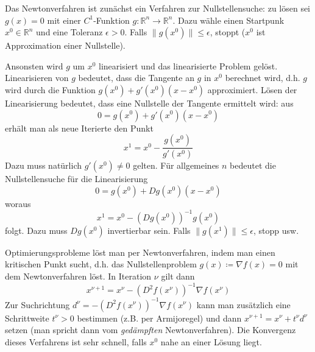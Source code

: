 \documentclass[12pt]{extreport} %
\newcommand{\R}{\mathbb{R}}
\theoremstyle{named}
\theoremstyle{nnamed}
\theoremstyle{itshape}
\theoremstyle{normal}
\begin{document}
Das Newtonverfahren ist zunächst ein Verfahren zur Nullstellensuche: zu lösen sei $g(x) = 0$ mit einer $C^1$-Funktion $g \colon \R^n \rightarrow \R^n$. Dazu wähle einen Startpunk $x^0 \in \R^n$ und eine Toleranz $\epsilon > 0$. Falls $\| g(x^0)\| \leq \epsilon$, stoppt ($x^0$ ist Approximation einer Nullstelle). ~\bigskip

Ansonsten wird $g$ um $x^0$ linearisiert und das linearisierte Problem gelöst. Linearisieren von $g$ bedeutet, dass die Tangente an $g$ in $x^0$ berechnet wird, d.h. $g$ wird durch die Funktion $g(x^0) + g'(x^0) (x - x^0)$ approximiert. Lösen der Linearisierung bedeutet, dass eine Nullstelle der Tangente ermittelt wird: aus
	$$ 0 = g(x^0) + g'(x^0) (x - x^0) $$
	erhält man als neue Iterierte den Punkt
	$$ x^1 = x^0 - \frac{g(x^0)}{g'(x^0)} $$
	Dazu muss natürlich $g'(x^0) \neq 0$ gelten. Für allgemeines $n$ bedeutet die Nullstellensuche für die Linearisierung
	$$ 0 = g(x^0) + D g(x^0) (x - x^0) $$
	woraus
	$$ x^1 = x^0 - \left( Dg(x^0) \right)^{-1} g(x^0) $$
	folgt. Dazu muss $D g(x^0)$ invertierbar sein. Falls $\| g(x^1) \| \leq \epsilon$, stopp usw. ~\bigskip
	
	Optimierungsprobleme löst man per Newtonverfahren, indem man einen kritischen Punkt sucht, d.h. das Nullstellenproblem $g(x) \coloneqq \nabla f(x) = 0$ mit dem Newtonverfahren löst. In Iteration $\nu$ gilt dann
	$$ x^{\nu + 1} = x^\nu - \left( D^2 f(x^\nu) \right)^{-1} \nabla f(x^\nu) $$
	Zur Suchrichtung $d^\nu = - \left( D^2 f(x^\nu) \right)^{-1} \nabla f(x^\nu)$ kann man zusätzlich eine Schrittweite $t^\nu > 0$ bestimmen (z.B. per Armijoregel) und dann $x^{\nu + 1} = x^\nu + t^\nu d^\nu$ setzen (man spricht dann vom \textit{gedämpften} Newtonverfahren). Die Konvergenz dieses Verfahrens ist sehr schnell, falls $x^0$ nahe an einer Lösung liegt. ~\bigskip
	
\end{document}
